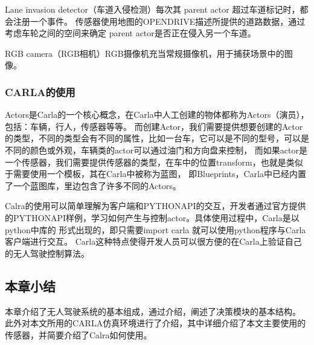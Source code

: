 Lane invasion detector（车道入侵检测）每次其 parent actor 超过车道标记时，都会注册一个事件。 
传感器使用地图的OPENDRIVE描述所提供的道路数据，通过考虑车轮之间的空间来确定 parent actor是否正在侵入另一个车道。

RGB camera（RGB相机）RGB摄像机充当常规摄像机，用于捕获场景中的图像。
\subsubsection{CARLA的使用}
Actors是Carla的一个核心概念，在Carla中人工创建的物体都称为Actors（演员），包括：车辆，行人，传感器等等。
而创建Actor，我们需要提供想要创建的Actor的类型，不同的类型会有不同的属性，比如一台车，它可以是不同的型号，可以是不同的颜色或外观，车辆类的actor可以通过油门和方向盘来控制，
而如果actor是一个传感器，我们需要提供传感器的类型，在车中的位置transform，也就是类似于需要使用一个模板，其在Carla中被称为蓝图，
即Blueprints，Carla中已经内置了一个蓝图库，里边包含了许多不同的Actors。

Calra的使用可以简单理解为客户端和PYTHONAPI的交互，开发者通过官方提供的PYTHONAPI样例，学习如何产生与控制actor。具体使用过程中，Carla是以python中库的
形式出现的，即只需要import carla 就可以使用python程序与Carla客户端进行交互。
Carla这种特点使得开发人员可以很方便的在Carla上验证自己的无人驾驶控制算法。

\subsection{本章小结}
本章介绍了无人驾驶系统的基本组成，通过介绍，阐述了决策模块的基本结构。
此外对本文所用的CARLA仿真环境进行了介绍，其中详细介绍了本文主要使用的传感器，并简要介绍了Calra如何使用。
